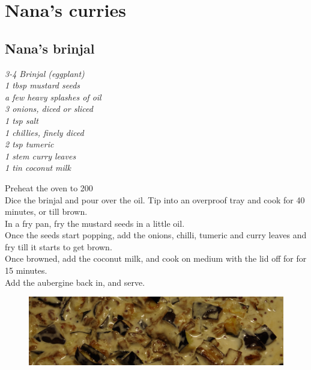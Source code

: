 \documentclass{tufte-book}
\begin{document}
\chapter{Nana's curries}

\section{Nana's brinjal}

\emph{3-4 Brinjal (eggplant)
\\1 tbsp mustard seeds
\\a few heavy splashes of oil
\\3 onions, diced or sliced
\\1 tsp salt
\\1 chillies, finely diced
\\2 tsp tumeric
\\1 stem curry leaves
\\1 tin coconut milk}

Preheat the oven to 200\celsius 
\\Dice the brinjal and pour over the oil. Tip into an overproof tray and cook for 40 minutes, or till brown.
\\In a fry pan, fry the mustard seeds in a little oil.
\\Once the seeds start popping, add the onions, chilli, tumeric and curry leaves and fry till it starts to get brown.
\\Once browned, add the coconut milk, and cook on medium with the lid off for for 15 minutes.  
\\Add the aubergine back in, and serve.

\begin{figure}
  \includegraphics{eggplantcurry.png}
\end{figure}

\end{document}
